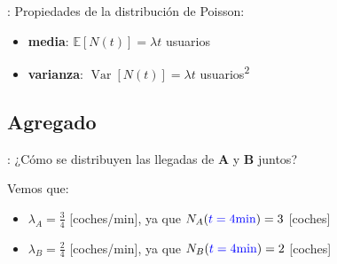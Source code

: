 \documentclass{beamer}
\DeclareMathOperator{\Var}{Var}
\newcommand{\red}[1]{{\color{red}#1}}
\newcommand{\blue}[1]{{\color{blue}#1}}
\begin{document}




\begin{frame}{\secname: \subsecname}
    Propiedades de la distribución de Poisson:
    \begin{itemize}
        \item \textbf{media}: $\mathbb{E}[N(t)]=\lambda t$ usuarios
        \item \textbf{varianza}: $\Var[N(t)]=\lambda t$ usuarios\textsuperscript{2}
    \end{itemize}

    \begin{figure}
        
    \end{figure}
\end{frame}




\subsection{Agregado}
\begin{frame}{\secname: \subsecname}
    ¿Cómo se distribuyen las llegadas
    de \textbf{\color{Firebrick1}A} y
    \textbf{\color{Firebrick4}B} juntos?

    \begin{figure}
        
    \end{figure}

    Vemos que:
    \begin{itemize}
        \item {\color{Firebrick1}$\lambda_A=\tfrac{3}{4}$} [coches/min], ya que {\color{HotPink1}$N_A(\blue{t=4\text{min}})=3$} [coches]
        \item {\color{Firebrick4}$\lambda_B=\tfrac{2}{4}$} [coches/min], ya que {\color{HotPink4}$N_B(\blue{t=4\text{min}})=2$} [coches]
    \end{itemize}

\end{frame}
\end{document}
